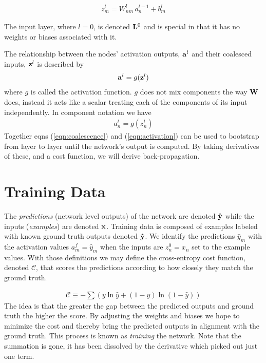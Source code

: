 \documentclass[twocolumn]{revtex4-1}
\newcommand{\bld}[1]{\vectorbold{#1}}
\begin{document}
\begin{align}
    \label{eqn:componentCoalescence}
    z^l_m = W^l_{n m} \, a^{l - 1}_n + b^{l}_m
\end{align}

The input layer, where $l = 0$, is denoted $\bld{L}^0$ and is special in that it has no weights or biases associated with it.

The relationship between the nodes' activation outputs, $\bld{a}^l$ and their coalesced inputs, $\bld{z}^l$ is described by
\begin{align}
    \label{eqn:activation}
    \bld{a}^l = g(\bld{z}^l)
\end{align}
where $g$ is called the activation function. $g$ does not mix components the way $\bld{W}$ does, instead it acts like a scalar treating each of the components of its input independently. In component notation we have
\begin{align}
    a^l_n = g(z^l_n)
\end{align}
Together eqns (\ref{eqn:coalescence}) and (\ref{eqn:activation}) can be used to bootstrap from layer to layer until the network's output is computed. By taking derivatives of these, and a cost function, we will derive back-propagation.

\section{Training Data}
The \textit{predictions} (network level outputs) of the network are denoted $\bld{\hat{y}}$ while the inputs (\textit{examples}) are denoted $\bld{x}$. Training data is composed of examples labeled with known ground truth outputs denoted $\bld{\hat{y}}$. We identify the predictions $\hat{y}_m$ with the activation values $a^f_m = \hat{y}_m$ when the inputs are $z^0_n = x_n$ set to the example values. With those definitions we may define the cross-entropy cost function, denoted $\mathscr{C}$, that scores the predictions according to how closely they match the ground truth.

\begin{align}
    \label{eqn:costDefn}
    \mathscr{C} \equiv - \sum \left(y \ln \hat{y} + (1 - y) \ln (1 - \hat{y}) \right)
\end{align}
The idea is that the greater the gap between the predicted outputs and ground truth the higher the score. By adjusting the weights and biases we hope to minimize the cost and thereby bring the predicted outputs in alignment with the ground truth. This process is known as \textit{training} the network. Note that the summation is gone, it has been dissolved by the derivative which picked out just one term.
\end{document}
